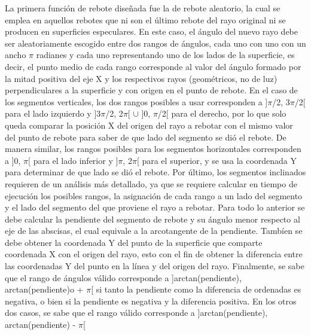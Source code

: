 \documentclass[conference]{IEEEtran}
\begin{document}
La primera función de rebote diseñada fue la de rebote aleatorio, la cual se emplea en aquellos rebotes que ni son el último rebote del rayo original ni se producen en superficies especulares. En este caso, el ángulo del nuevo rayo debe ser aleatoriamente escogido entre dos rangos de ángulos, cada uno con uno con un ancho $\pi$ radianes y cada uno representando uno de los lados de la superficie, es decir, el punto medio de cada rango corresponde al valor del ángulo formado por la mitad positiva del eje X y los respectivos rayos (geométricos, no de luz) perpendiculares a la superficie y con origen en el punto de rebote. En el caso de los segmentos verticales, los dos rangos posibles a usar corresponden a ]$\pi$/2, 3$\pi$/2[ para el lado izquierdo y ]3$\pi$/2, 2$\pi$[ $\cup$ ]0,  $\pi$/2[ para el derecho, por lo que solo queda comparar la posición X del origen del rayo a rebotar con el mismo valor del punto de rebote para saber de que lado del segmento se dió el rebote. De manera similar, los rangos posibles para los segmentos horizontales corresponden a ]0, $\pi$[ para el lado inferior y ]$\pi$,  2$\pi$[ para el superior, y se usa la coordenada Y para determinar de que lado se dió el rebote. Por último, los segmentos inclinados requieren de un análisis más detallado, ya que se requiere calcular en tiempo de ejecución los posibles rangos, la asignación de cada rango a un lado del segmento y el lado del segmento del que proviene el rayo a rebotar. Para todo lo anterior se debe calcular la pendiente del segmento de rebote y su ángulo menor respecto al eje de las abscisas, el cual equivale a la arcotangente de la pendiente. Tambíen se debe obtener la coordenada Y del punto de la superficie que comparte coordenada X con el origen del rayo, esto con el fin de obtener la diferencia entre las coordenadas Y del punto en la línea y del origen del rayo. Finalmente, se sabe que el rango de ángulos válido corresponde a ]arctan(pendiente), arctan(pendiente)o + $\pi$[ si tanto la pendiente como la diferencia de ordenadas es negativa, o bien si la pendiente es negativa y la diferencia positiva. En los otros dos casos, se sabe que el rango válido corresponde a ]arctan(pendiente), arctan(pendiente) - $\pi$[
\end{document}
